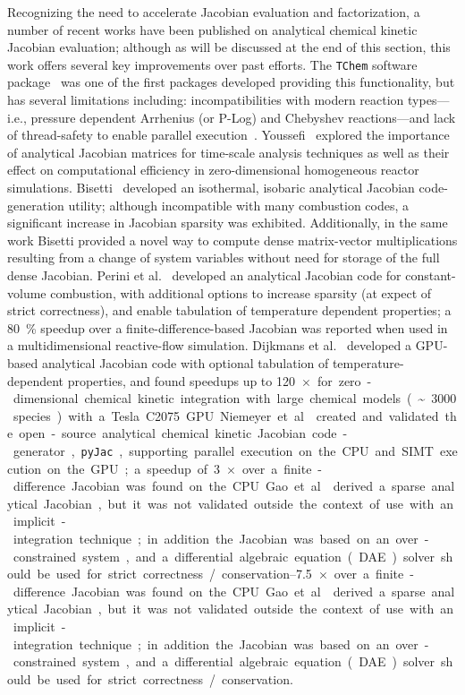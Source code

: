 \documentclass[12pt,number,sort&compress,preprint]{elsarticle}
\begin{document}
Recognizing the need to accelerate Jacobian evaluation and factorization, a number of recent works have been published on analytical chemical kinetic Jacobian evaluation; although as will be discussed at the end of this section, this work offers several key improvements over past efforts.
The \texttt{TChem} software package~\cite{Safta:2011vn} was one of the first packages developed providing this functionality, but has several limitations including: incompatibilities with modern reaction types---i.e., pressure dependent Arrhenius (or P-Log) and Chebyshev reactions---and lack of thread-safety to enable parallel execution~\cite{Curtis2017:tchem}. 
Youssefi~\cite{Youssefi:2011tm} explored the importance of analytical Jacobian matrices for time-scale analysis techniques as well as their effect on computational efficiency in zero-dimensional homogeneous reactor simulations.
Bisetti~\cite{Bisetti:2012jw} developed an isothermal, isobaric analytical Jacobian code-generation utility; although incompatible with many combustion codes, a significant increase in Jacobian sparsity was exhibited.
Additionally, in the same work Bisetti provided a novel way to compute dense matrix-vector multiplications resulting from a change of system variables without need for storage of the full dense Jacobian.
Perini et al.~\cite{Perini:2012gy} developed an analytical Jacobian code for constant-volume combustion, with additional options to increase sparsity (at expect of strict correctness), and enable tabulation of temperature dependent properties; a \SI{80}{\percent} speedup over a finite-difference-based Jacobian was reported when used in a multidimensional reactive-flow simulation.
Dijkmans et al.~\cite{Dijkmans:2014bb} developed a GPU-based analytical Jacobian code with optional tabulation of temperature-dependent properties, and found speedups up to \SI{120}{$\times$} for zero-dimensional chemical kinetic integration with large chemical models (\textasciitilde\num{3000} species) with a Tesla C2075 GPU.
Niemeyer et al.~\cite{Niemeyer:2016aa} created and validated the open-source analytical chemical kinetic Jacobian code-generator, \texttt{pyJac}, supporting parallel execution on the CPU and SIMT execution on the GPU; a speedup of \SIrange{3}{7.5}{$\times$} over a finite-difference Jacobian was found on the CPU.
Gao et al.~\cite{GAO2015287} derived a sparse analytical Jacobian, but it was not validated outside the context of use with an implicit-integration technique; in addition the Jacobian was based on an over-constrained system, and a differential algebraic equation (DAE) solver should be used for strict correctness\slash conservation.
\end{document}
